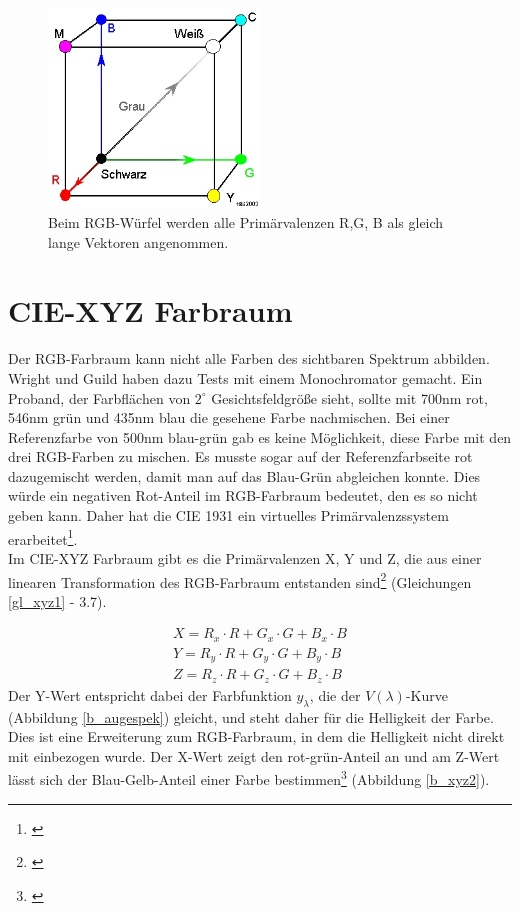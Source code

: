 \begin{figure}[H]     %
\centering
\includegraphics[width=0.5\textwidth]{bilder/rgb1} 
\caption {Beim RGB-Würfel werden alle Primärvalenzen R,G, B als gleich lange Vektoren angenommen.\protect\footnotemark}\label{b_rgb1}
\end{figure}
 

\section{CIE-XYZ Farbraum} \label{sec_xyz}

Der RGB-Farbraum kann nicht alle Farben des sichtbaren Spektrum abbilden. Wright und Guild haben dazu Tests mit einem Monochromator gemacht. Ein Proband, der Farbflächen von $2^\circ$ Gesichtsfeldgröße sieht, sollte mit 700nm rot, 546nm grün und 435nm blau die gesehene Farbe nachmischen. Bei einer Referenzfarbe von 500nm blau-grün gab es keine Möglichkeit, diese Farbe mit den drei RGB-Farben zu mischen. Es musste sogar auf der Referenzfarbseite rot dazugemischt werden, damit man auf das Blau-Grün abgleichen konnte. Dies würde ein negativen Rot-Anteil im RGB-Farbraum bedeutet, den es so nicht geben kann. Daher hat die CIE 1931 ein virtuelles Primärvalenzssystem erarbeitet\footnote{\cite[77]{greule}}.\\
Im CIE-XYZ Farbraum gibt es die Primärvalenzen X, Y und Z, die aus einer linearen Transformation des RGB-Farbraum entstanden sind\footnote{\cite[76-77]{greule}} (Gleichungen  \ref{gl_xyz1} - 3.7).

\begin{eqnarray}\label{gl_xyz1}
		X = R_{x}\cdot R + G_{x}\cdot G + B_{x}\cdot B\\
		Y = R_{y}\cdot R + G_{y}\cdot G + B_{y}\cdot B\\
		Z = R_{z}\cdot R + G_{z}\cdot G + B_{z}\cdot B
\end{eqnarray}
Der Y-Wert entspricht dabei der Farbfunktion $y_{\lambda}$, die der $V(\lambda)$-Kurve (Abbildung \ref{b_augespek}) gleicht, und steht daher für die Helligkeit der Farbe. Dies ist eine Erweiterung zum RGB-Farbraum, in dem die Helligkeit nicht direkt mit einbezogen wurde. Der X-Wert zeigt den rot-grün-Anteil an und am Z-Wert lässt sich der Blau-Gelb-Anteil einer Farbe bestimmen\footnote{\cite[72]{mueller}} (Abbildung \ref{b_xyz2}).

